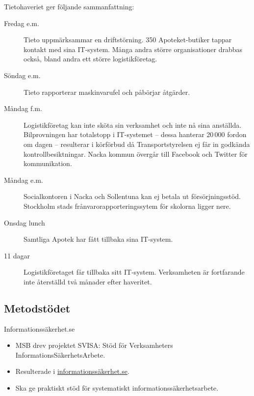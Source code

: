 \documentclass{beamer}
\begin{document}
\begin{frame}[allowframebreaks]{Tietohaveriet}
  \citet{Lindkvist2012tdf} ger följande sammanfattning:
  \begin{description}
    \item[Fredag e.m.] Tieto uppmärksammar en driftstörning.
      350 Apoteket-butiker tappar kontakt med sina IT-system.
      Många andra större organisationer drabbas också, bland andra ett större 
      logistikföretag.

    \item[Söndag e.m.] Tieto rapporterar maskinvarufel och påbörjar åtgärder.

    \item[Måndag f.m.] Logistikföretag kan inte sköta sin verksamhet och inte 
      nå sina anställda.
      Bilprovningen har totalstopp i IT-systemet -- dessa hanterar 20\,000 
      fordon om dagen -- resulterar i körförbud då Transportstyrelsen ej får in 
      godkända kontrollbesiktningar.
      Nacka kommun övergår till Facebook och Twitter för kommunikation.

    \item[Måndag e.m.] Socialkontoren i Nacka och Sollentuna kan ej betala ut 
      försörjningsstöd.
      Stockholm stads frånvarorapporteringssytem för skolorna ligger nere.

    \item[Onsdag lunch] Samtliga Apotek har fått tillbaka sina IT-system.

    \item[11 dagar] Logistikföretaget får tillbaka sitt IT-system.
      Verksamheten är fortfarande inte återställd två månader efter haveritet.

  \end{description}
\end{frame}

\subsection{Metodstödet}

\begin{frame}{Informationssäkerhet.se}
  \begin{itemize}
    \item MSB drev projektet SVISA\@: Stöd för Verksamheters 
      InformationsSäkerhetsArbete.

    \item Resulterade i \url{informationssäkerhet.se}.

    \item Ska ge praktiskt stöd för systematiskt informationssäkerhetsarbete.

  \end{itemize}
\end{frame}
\end{document}
